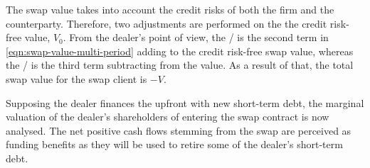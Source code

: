 \documentclass[main.tex]{subfiles}
\begin{document}
        The swap value takes into account the credit risks of both the firm and the counterparty.
        Therefore, two adjustments are performed on the the credit risk-free value, $V_0$.
        From the dealer's point of view,
        the \DVA/ is the second term in \cref{eqn:swap-value-multi-period} adding to the credit risk-free swap value,
        whereas the \CVA/ is the third term subtracting from the value.
        As a result of that, the total swap value for the swap client is $-V$.

        Supposing the dealer finances the upfront with new short-term debt, the marginal valuation of the dealer's shareholders of entering the swap contract is now analysed.
        The net positive cash flows stemming from the swap are perceived as funding benefits as they will be used to retire some of the dealer's short-term debt.
        
\end{document}
